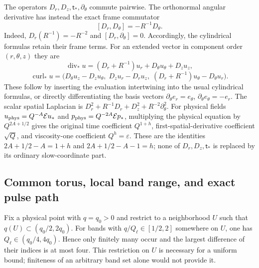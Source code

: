 \documentclass[10pt,a4paper]{article}
\newcounter{none}
\begin{document}
The operators $D_r,D_z,\mathsf t_*,\partial_\theta$ commute pairwise.
The orthonormal angular derivative has instead the exact frame
commutator
\[
 [D_r,D_\theta]=-R^{-1}D_\theta.
\]
Indeed, $D_r(R^{-1})=-R^{-2}$ and $[D_r,\partial_\theta]=0$.
Accordingly, the cylindrical formulas retain their frame terms.  For
an extended vector in component order $(r,\theta,z)$ they are
\[
 \operatorname{div}_*u=(D_r+R^{-1})u_r+D_\theta u_\theta+D_zu_z,
\]
\[
 \operatorname{curl}_*u=
 \bigl(D_\theta u_z-D_zu_\theta,\;
       D_zu_r-D_ru_z,\;
       (D_r+R^{-1})u_\theta-D_\theta u_r\bigr).
\]
These follow by inserting the evaluation intertwining into the usual
cylindrical formulas, or directly differentiating the basis vectors
$\partial_\theta e_r=e_\theta$, $\partial_\theta e_\theta=-e_r$.
The scalar spatial Laplacian is
$D_r^2+R^{-1}D_r+D_z^2+R^{-2}\partial_\theta^2$.
For physical fields $u_{\rm phys}=Q^{-A}\mathcal Eu_*$ and
$p_{\rm phys}=Q^{-2A}\mathcal Ep_*$, multiplying the physical equation
by $Q^{2A+1/2}$ gives the original time coefficient $Q^{1+h}$,
first-spatial-derivative coefficient $\sqrt Q$, and viscosity-one
coefficient $Q^h=\varepsilon$.  These are the identities
$2A+1/2-A=1+h$ and $2A+1/2-A-1=h$; none of $D_r,D_z,\mathsf t_*$
is replaced by its ordinary slow-coordinate part.

\subsection{Common torus, local band range, and exact pulse path}
Fix a physical point with $q=q_0>0$ and restrict to a neighborhood $U$
such that $q(U)\subset(q_0/2,2q_0)$.  For bands with
$q/Q_\ell\in[1/2,2]$ somewhere on $U$, one has
$Q_\ell\in(q_0/4,4q_0)$.  Hence only finitely many occur and the
largest difference of their indices is at most four.  This restriction
on $U$ is necessary for a uniform bound; finiteness of an arbitrary
band set alone would not provide it.
\end{document}
